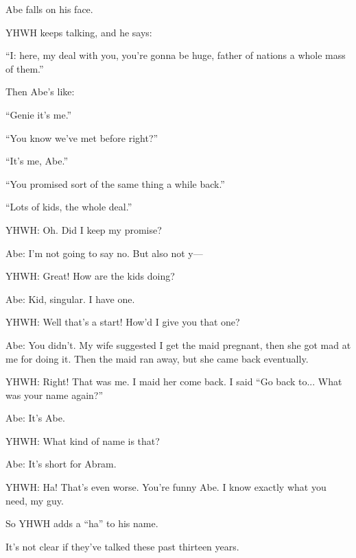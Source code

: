 {
}
{
}
{
	Abe falls on his face.
	
	YHWH keeps talking, and he says:
}

{
}
{
}
{
	``I: here, my deal with you, you're gonna be huge,
	father of nations a whole mass of them.''
	
	\begin{midrash}
	
	Then Abe's like:
	
	``Genie it's me.''

	``You know we've met before right?''

	``It's me, Abe.''

	``You promised sort of the same thing a while back.''

	``Lots of kids, the whole deal.''

	YHWH: Oh. Did I keep my promise?

	Abe: I'm not going to say no. But also not y---

	YHWH: Great! How are the kids doing?

	Abe: Kid, singular. I have one.

	YHWH: Well that's a start! How'd I give you that one?

	Abe: You didn't. My wife suggested I get the maid pregnant,
	then she got mad at me for doing it. Then the maid ran away,
	but she came back eventually.

	YHWH: Right! That was me. I maid her come back. I said ``Go back to... What was your name again?''

	Abe: It's Abe.

	YHWH: What kind of name is that?

	Abe: It's short for Abram.

	YHWH: Ha! That's even worse. You're funny Abe. I know exactly what you need, my guy.

	\end{midrash}
}

{
}
{
}
{
	So YHWH adds a ``ha'' to his name.

	It's not clear if they've talked these past thirteen years.
}

